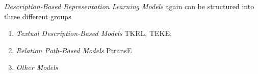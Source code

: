 \textit{Description-Based Representation Learning Models} again can be structured into three different groups
\begin{enumerate}
    \item 
    \textit{Textual Description-Based Models}
    TKRL, TEKE, 
    
    \item 
    \textit{Relation Path-Based Models}
    PtransE
    
    \item 
    \textit{Other Models}
    
\end{enumerate}





